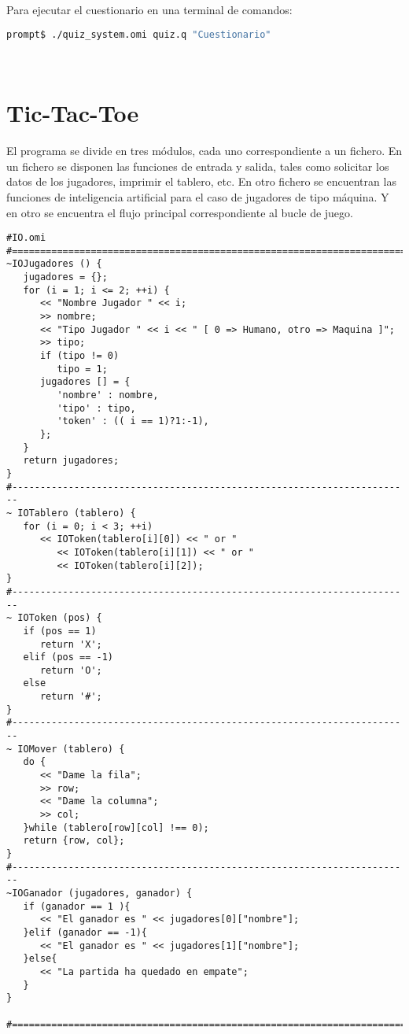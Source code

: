 Para ejecutar el cuestionario en una terminal de comandos:\\

\begin{lstlisting}[language=bash]
prompt$ ./quiz_system.omi quiz.q "Cuestionario"
\end{lstlisting}
\hfill\\

\section{Tic-Tac-Toe}
\label{sec:tic-tac-toe}
El programa se divide en tres módulos, cada uno correspondiente a un fichero. En un fichero se disponen las funciones de entrada y salida, tales como
solicitar los datos de los jugadores, imprimir el tablero, etc. En otro fichero se encuentran las funciones de inteligencia artificial para el caso de 
jugadores de tipo máquina. Y en otro se encuentra el flujo principal correspondiente al bucle de juego.

\begin{lstlisting}[language=omi]
#IO.omi
#=======================================================================
~IOJugadores () {
   jugadores = {};
   for (i = 1; i <= 2; ++i) {
      << "Nombre Jugador " << i;
      >> nombre;
      << "Tipo Jugador " << i << " [ 0 => Humano, otro => Maquina ]";
      >> tipo;
      if (tipo != 0) 
         tipo = 1;
      jugadores [] = { 
         'nombre' : nombre,
         'tipo' : tipo,
         'token' : (( i == 1)?1:-1),
      };
   }
   return jugadores; 
}
#-----------------------------------------------------------------------
~ IOTablero (tablero) {
   for (i = 0; i < 3; ++i) 
      << IOToken(tablero[i][0]) << " or " 
         << IOToken(tablero[i][1]) << " or " 
         << IOToken(tablero[i][2]);
}
#-----------------------------------------------------------------------
~ IOToken (pos) {
   if (pos == 1) 
      return 'X';
   elif (pos == -1)
      return 'O';
   else
      return '#';
}
#-----------------------------------------------------------------------
~ IOMover (tablero) {
   do {
      << "Dame la fila";
      >> row;
      << "Dame la columna";
      >> col;
   }while (tablero[row][col] !== 0);
   return {row, col};
}
#-----------------------------------------------------------------------
~IOGanador (jugadores, ganador) {
   if (ganador == 1 ){
      << "El ganador es " << jugadores[0]["nombre"];
   }elif (ganador == -1){
      << "El ganador es " << jugadores[1]["nombre"];
   }else{
      << "La partida ha quedado en empate";
   }
}

#=======================================================================
\end{lstlisting}
\hfill\\

